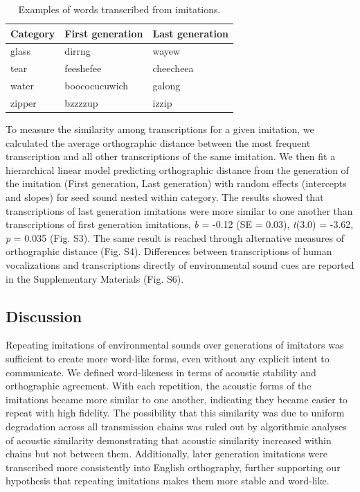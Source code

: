 \documentclass[english,floatsintext,man]{apa6}
\theoremstyle{definition}
\theoremstyle{definition}
\theoremstyle{definition}
\theoremstyle{remark}
\begin{document}
\begin{table}

\caption{\label{tab:table1}Examples of words transcribed from imitations.}
\centering
\begin{tabular}[t]{l|l|l}
\hline
Category & First generation & Last generation\\
\hline
glass & dirrng & wayew\\
\hline
tear & feeshefee & cheecheea\\
\hline
water & boococucuwich & galong\\
\hline
zipper & bzzzzup & izzip\\
\hline
\end{tabular}
\end{table}

To measure the similarity among transcriptions for a given imitation, we
calculated the average orthographic distance between the most frequent
transcription and all other transcriptions of the same imitation. We
then fit a hierarchical linear model predicting orthographic distance
from the generation of the imitation (First generation, Last generation)
with random effects (intercepts and slopes) for seed sound nested within
category. The results showed that transcriptions of last generation
imitations were more similar to one another than transcriptions of first
generation imitations, \emph{b} = -0.12 (SE = 0.03), \emph{t}(3.0) =
-3.62, \emph{p} = 0.035 (Fig. S3). The same result is reached through
alternative measures of orthographic distance (Fig. S4). Differences
between transcriptions of human vocalizations and transcriptions
directly of environmental sound cues are reported in the Supplementary
Materials (Fig. S6).

\hypertarget{discussion}{%
\subsection{Discussion}\label{discussion}}

Repeating imitations of environmental sounds over generations of
imitators was sufficient to create more word-like forms, even without
any explicit intent to communicate. We defined word-likeness in terms of
acoustic stability and orthographic agreement. With each repetition, the
acoustic forms of the imitations became more similar to one another,
indicating they became easier to repeat with high fidelity. The
possibility that this similarity was due to uniform degradation across
all transmission chains was ruled out by algorithmic analyses of
acoustic similarity demonstrating that acoustic similarity increased
within chains but not between them. Additionally, later generation
imitations were transcribed more consistently into English orthography,
further supporting our hypothesis that repeating imitations makes them
more stable and word-like.
\end{document}
